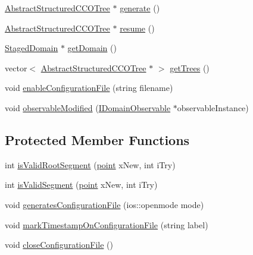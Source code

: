 \begin{DoxyCompactItemize}
\item 
\hyperlink{class_abstract_structured_c_c_o_tree}{Abstract\+Structured\+C\+C\+O\+Tree} $\ast$ \hyperlink{class_staged_fixed_perfusion_radius_tree_generator_a70ac52ecd809fe9a44a71837f7c2eba7}{generate} ()
\item 
\hyperlink{class_abstract_structured_c_c_o_tree}{Abstract\+Structured\+C\+C\+O\+Tree} $\ast$ \hyperlink{class_staged_fixed_perfusion_radius_tree_generator_a2090143d4271546bca00642d1c15047c}{resume} ()
\item 
\hyperlink{class_staged_domain}{Staged\+Domain} $\ast$ \hyperlink{class_staged_fixed_perfusion_radius_tree_generator_a961fc35b5a58d8c47127deb4214c53e6}{get\+Domain} ()
\item 
vector$<$ \hyperlink{class_abstract_structured_c_c_o_tree}{Abstract\+Structured\+C\+C\+O\+Tree} $\ast$ $>$ \hyperlink{class_staged_fixed_perfusion_radius_tree_generator_a11469cfa244770c9c79f8309238d8242}{get\+Trees} ()
\item 
void \hyperlink{class_staged_fixed_perfusion_radius_tree_generator_a7b086875be59a62a408934c8627dc07a}{enable\+Configuration\+File} (string filename)
\item 
void \hyperlink{class_staged_fixed_perfusion_radius_tree_generator_a344e071b8da2eea979efdbdeb650a2a6}{observable\+Modified} (\hyperlink{class_i_domain_observable}{I\+Domain\+Observable} $\ast$observable\+Instance)
\end{DoxyCompactItemize}
\subsection*{Protected Member Functions}
\begin{DoxyCompactItemize}
\item 
int \hyperlink{class_staged_fixed_perfusion_radius_tree_generator_ab8cfe2b17bc202e5cc7546ff9dc3d02b}{is\+Valid\+Root\+Segment} (\hyperlink{structpoint}{point} x\+New, int i\+Try)
\item 
int \hyperlink{class_staged_fixed_perfusion_radius_tree_generator_aecea1680252fab904014dddd59468b83}{is\+Valid\+Segment} (\hyperlink{structpoint}{point} x\+New, int i\+Try)
\item 
void \hyperlink{class_staged_fixed_perfusion_radius_tree_generator_ad520d182aaf13eef8ebf481a2b2a3087}{generates\+Configuration\+File} (ios\+::openmode mode)
\item 
void \hyperlink{class_staged_fixed_perfusion_radius_tree_generator_a58b8b5faaa3682b883376949f6741f0c}{mark\+Timestamp\+On\+Configuration\+File} (string label)
\item 
void \hyperlink{class_staged_fixed_perfusion_radius_tree_generator_a61d7acf210d76dd2d59fffc445c3b737}{close\+Configuration\+File} ()
\end{DoxyCompactItemize}
